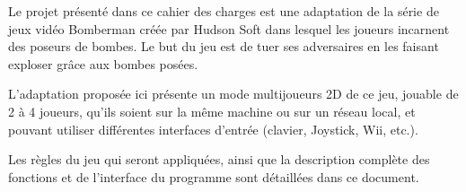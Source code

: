 Le projet présenté dans ce cahier des charges est une adaptation de la série de jeux vidéo Bomberman créée par Hudson Soft dans lesquel les joueurs incarnent des poseurs de bombes. Le but du jeu est de tuer ses adversaires en les faisant exploser grâce aux bombes posées.

L'adaptation proposée ici présente un mode multijoueurs 2D de ce jeu, jouable de 2 à 4 joueurs, qu'ils soient sur la même machine ou sur un réseau local, et pouvant utiliser différentes interfaces d'entrée (clavier, Joystick, Wii, etc.).

Les règles du jeu qui seront appliquées, ainsi que la description complète des fonctions et de l'interface du programme sont détaillées dans ce document.